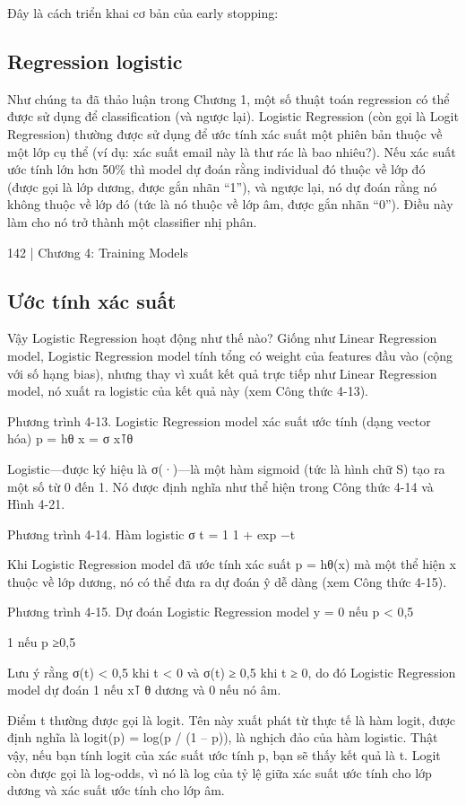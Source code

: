 Đây là cách triển khai cơ bản của early stopping:

\subsection{Regression logistic}

Như chúng ta đã thảo luận trong Chương 1, một số thuật toán regression có thể được sử dụng để classification (và ngược lại). Logistic Regression (còn gọi là Logit Regression) thường được sử dụng để ước tính xác suất một phiên bản thuộc về một lớp cụ thể (ví dụ: xác suất email này là thư rác là bao nhiêu?). Nếu xác suất ước tính lớn hơn 50\% thì model dự đoán rằng individual đó thuộc về lớp đó (được gọi là lớp dương, được gắn nhãn “1”), và ngược lại, nó dự đoán rằng nó không thuộc về lớp đó (tức là nó thuộc về lớp âm, được gắn nhãn “0”). Điều này làm cho nó trở thành một classifier nhị phân.

142 | Chương 4: Training Models

\subsection{Ước tính xác suất}

Vậy Logistic Regression hoạt động như thế nào? Giống như Linear Regression model, Logistic Regression model tính tổng có weight của features đầu vào (cộng với số hạng bias), nhưng thay vì xuất kết quả trực tiếp như Linear Regression model, nó xuất ra logistic của kết quả này (xem Công thức 4-13).

Phương trình 4-13. Logistic Regression model xác suất ước tính (dạng vector hóa) p = hθ x = σ x⊺θ

Logistic—được ký hiệu là σ(·)—là một hàm sigmoid (tức là hình chữ S) tạo ra một số từ 0 đến 1. Nó được định nghĩa như thể hiện trong Công thức 4-14 và Hình 4-21.

Phương trình 4-14. Hàm logistic σ t = 1 1 + exp −t

Khi Logistic Regression model đã ước tính xác suất p = hθ(x) mà một thể hiện x thuộc về lớp dương, nó có thể đưa ra dự đoán ŷ dễ dàng (xem Công thức 4-15).

Phương trình 4-15. Dự đoán Logistic Regression model y = 0 nếu p < 0,5

1 nếu p ≥0,5

Lưu ý rằng σ(t) < 0,5 khi t < 0 và σ(t) ≥ 0,5 khi t ≥ 0, do đó Logistic Regression model dự đoán 1 nếu x⊺ θ dương và 0 nếu nó âm.

Điểm t thường được gọi là logit. Tên này xuất phát từ thực tế là hàm logit, được định nghĩa là logit(p) = log(p / (1 – p)), là nghịch đảo của hàm logistic. Thật vậy, nếu bạn tính logit của xác suất ước tính p, bạn sẽ thấy kết quả là t. Logit còn được gọi là log-odds, vì nó là log của tỷ lệ giữa xác suất ước tính cho lớp dương và xác suất ước tính cho lớp âm.

